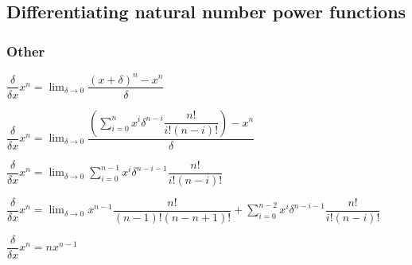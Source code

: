 
\subsection{Differentiating natural number power functions}

\subsubsection{Other}

\(\dfrac{\delta }{\delta x}x^n=\lim_{\delta \rightarrow 0}\dfrac{(x+\delta)^n-x^n}{\delta}\)

\(\dfrac{\delta }{\delta x}x^n=\lim_{\delta \rightarrow 0}\dfrac{(\sum_{i=0}^n x^i\delta ^{n-i}\dfrac{n!}{i!(n-i)!})-x^n}{\delta}\)

\(\dfrac{\delta }{\delta x}x^n=\lim_{\delta \rightarrow 0}\sum_{i=0}^{n-1} x^i\delta ^{n-i-1}\dfrac{n!}{i!(n-i)!}\)

\(\dfrac{\delta }{\delta x}x^n=\lim_{\delta \rightarrow 0}x^{n-1}\dfrac{n!}{(n-1)!(n-n+1)!}+\sum_{i=0}^{n-2} x^i\delta ^{n-i-1}\dfrac{n!}{i!(n-i)!}\)

\(\dfrac{\delta }{\delta x}x^n=nx^{n-1}\)


